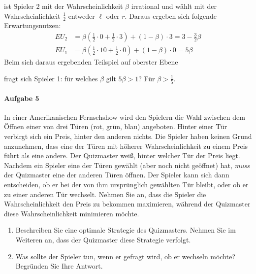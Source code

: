 \begin{enumerate}
\begin{center}
    \end{center}
    ist Spieler 2 mit der Wahrscheinlichkeit $\beta$ irrational und wählt mit der
    Wahrscheinlichkeit $\frac{1}{2}$ entweder $\ell$ oder $r$.
    Daraus ergeben sich folgende Erwartungsnutzen:
    \begin{align*}
      EU_2 & = \beta(\frac{1}{2} \cdot 0 + \frac{1}{2} \cdot 3) + (1-\beta) \cdot 3
             = 3 - \frac{3}{2}\beta\\
      EU_1 & = \beta(\frac{1}{2} \cdot 10 + \frac{1}{2} \cdot 0) + (1-\beta) \cdot 0
             = 5 \beta
    \end{align*}
    Beim sich daraus ergebenden Teilspiel auf oberster Ebene
    \begin{center}
    \end{center}
    fragt sich Spieler 1: für welches $\beta$ gilt $5\beta > 1$?
    Für $\beta > \frac{1}{5}$.
\end{enumerate}

\paragraph{Aufgabe 5}%
\label{par:aufgabe_5}

In einer Amerikanischen Fernsehshow wird den Spielern die Wahl zwischen dem Öffnen einer
von drei Türen (rot, grün, blau) angeboten.
Hinter einer Tür verbirgt sich ein Preis, hinter den anderen nichts.
Die Spieler haben keinen Grund anzunehmen, dass eine der Türen mit höherer
Wahrscheinlichkeit zu einem Preis führt als eine andere.
Der Quizmaster weiß, hinter welcher Tür der Preis liegt.
Nachdem ein Spieler eine der Türen gewählt (aber noch nicht geöffnet) hat, \emph{muss} der
Quizmaster eine der anderen Türen öffnen.
Der Spieler kann sich dann entscheiden, ob er bei der von ihm ursprünglich gewählten Tür
bleibt, oder ob er zu einer anderen Tür wechselt.
Nehmen Sie an, dass die Spieler die Wahrscheinlichkeit den Preis zu bekommen maximieren,
während der Quizmaster diese Wahrscheinlichkeit minimieren möchte.

\begin{enumerate}
  \item Beschreiben Sie eine optimale Strategie des Quizmasters.
    Nehmen Sie im Weiteren an, dass der Quizmaster diese Strategie verfolgt.

  \item Was sollte der Spieler tun, wenn er gefragt wird, ob er wechseln möchte?
    Begründen Sie Ihre Antwort.
\end{enumerate}
